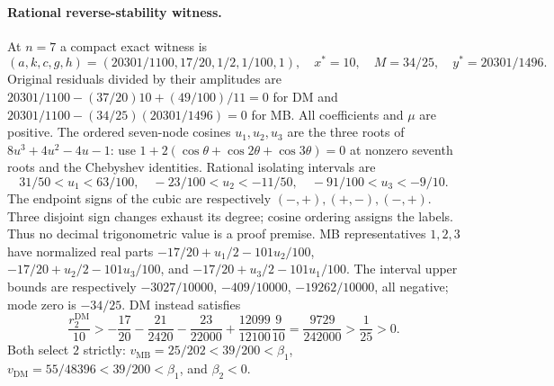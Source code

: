 \documentclass[11pt]{article}
\newcommand{\DM}{\mathrm{DM}}
\newcommand{\MB}{\mathrm{MB}}
\theoremstyle{definition}
\theoremstyle{remark}
\begin{document}
\paragraph{Rational reverse-stability witness.}
At $n=7$ a compact exact witness is
\begin{equation}
 (a,k,c,g,h)=(20301/1100,17/20,1/2,1/100,1),\quad
 x^*=10,\quad M=34/25,\quad y^*=20301/1496.
 \label{eq:P08-reverse-rational}
\end{equation}
Original residuals divided by their amplitudes are
$20301/1100-(37/20)10+(49/100)/11=0$ for DM and
$20301/1100-(34/25)(20301/1496)=0$ for MB.
All coefficients and $\mu$ are positive.
The ordered seven-node cosines $u_1,u_2,u_3$ are the three roots of
$8u^3+4u^2-4u-1$: use
$1+2(\cos\theta+\cos2\theta+\cos3\theta)=0$ at nonzero seventh roots
and the Chebyshev identities. Rational isolating intervals are
\begin{equation}
 31/50<u_1<63/100,\quad -23/100<u_2<-11/50,\quad
 -91/100<u_3<-9/10.\label{eq:P08-seven-intervals}
\end{equation}
The endpoint signs of the cubic are respectively $(-,+),(+,-),(-,+)$.
Three disjoint sign changes exhaust its degree; cosine ordering assigns
the labels. Thus no decimal trigonometric value is a proof premise.
MB representatives $1,2,3$ have normalized real parts
$-17/20+u_1/2-101u_2/100$,
$-17/20+u_2/2-101u_3/100$, and
$-17/20+u_3/2-101u_1/100$.
The interval upper bounds are respectively $-3027/10000$,
$-409/10000$, $-19262/10000$, all negative; mode zero is $-34/25$.
DM instead satisfies
\[
 \frac{r_2^{\DM}}{10}
 >-\frac{17}{20}-\frac{21}{2420}-\frac{23}{22000}
      +\frac{12099}{12100}\frac9{10}
 =\frac{9729}{242000}>\frac1{25}>0.
\]
Both select $2$ strictly: $v_{\MB}=25/202<39/200<\beta_1$,
$v_{\DM}=55/48396<39/200<\beta_1$, and $\beta_2<0$.
\end{document}
